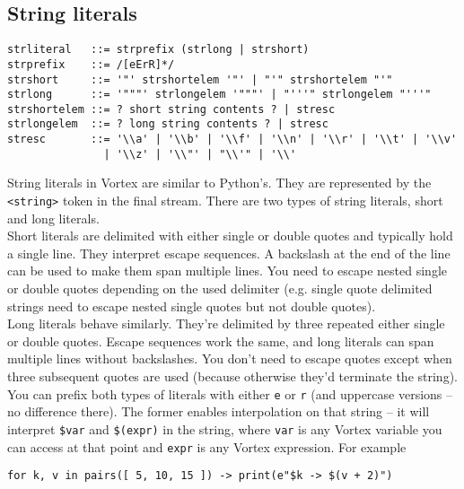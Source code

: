 \documentclass{article}
\begin{document}
\subsection{String literals}
\begin{lstlisting}[language=bnf]
strliteral   ::= strprefix (strlong | strshort)
strprefix    ::= /[eErR]*/
strshort     ::= '"' strshortelem '"' | "'" strshortelem "'"
strlong      ::= '"""' strlongelem '"""' | "'''" strlongelem "'''"
strshortelem ::= ? short string contents ? | stresc
strlongelem  ::= ? long string contents ? | stresc
stresc       ::= '\\a' | '\\b' | '\\f' | '\\n' | '\\r' | '\\t' | '\\v'
               | '\\z' | '\\"' | "\\'" | '\\'
\end{lstlisting}
String literals in Vortex are similar to Python's. They are represented by the \verb|<string>| token in the final stream. There are two types of string literals, short and long literals.\\
Short literals are delimited with either single or double quotes and typically hold a single line. They interpret escape sequences. A backslash at the end of the line can be used to make them span multiple lines. You need to escape nested single or double quotes depending on the used delimiter (e.g. single quote delimited strings need to escape nested single quotes but not double quotes).\\
Long literals behave similarly. They're delimited by three repeated either single or double quotes. Escape sequences work the same, and long literals can span multiple lines without backslashes. You don't need to escape quotes except when three subsequent quotes are used (because otherwise they'd terminate the string).\\
You can prefix both types of literals with either \verb|e| or \verb|r| (and uppercase versions -- no difference there). The former enables interpolation on that string -- it will interpret \verb|$var| and \verb|$(expr)| in the string, where \verb|var| is any Vortex variable you can access at that point and \verb|expr| is any Vortex expression. For example
\begin{lstlisting}[language=vortex]
for k, v in pairs([ 5, 10, 15 ]) -> print(e"$k -> $(v + 2)")
\end{lstlisting}
\end{document}
